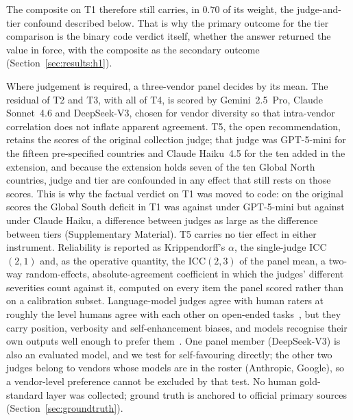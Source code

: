 The composite on T1 therefore still carries, in $0.70$ of its weight, the
judge-and-tier confound described below. That is why the primary outcome for the
tier comparison is the binary code verdict itself, whether the answer returned
the value in force, with the composite as the secondary outcome
(Section~\ref{sec:results:h1}).

Where judgement is required, a three-vendor panel decides by its mean. The
residual of T2 and T3, with all of T4, is scored by Gemini~2.5~Pro, Claude
Sonnet~4.6 and DeepSeek-V3, chosen for vendor diversity so that intra-vendor
correlation does not inflate apparent agreement. T5, the open recommendation,
retains the scores of the original collection judge; that judge was GPT-5-mini
for the fifteen pre-specified countries and Claude Haiku~4.5 for the ten added
in the extension, and because the extension holds seven of the ten Global North
countries, judge and tier are confounded in any effect that still rests on those
scores. This is why the factual verdict on T1 was moved to code: on the original
scores the Global South deficit in T1 was \njtgsgpt{} against \njtgngpt{} under
GPT-5-mini but \njtgshaiku{} against \njtgnhaiku{} under Claude Haiku, a
difference between judges as large as the difference between tiers
(Supplementary Material). T5 carries no tier effect in either instrument.
Reliability is reported as Krippendorff's $\alpha$, the single-judge ICC$(2,1)$
and, as the operative quantity, the ICC$(2,3)$ of the panel mean, a two-way
random-effects, absolute-agreement coefficient in which the judges' different
severities count against it, computed on every item the panel scored rather
than on a calibration subset. Language-model judges agree with human raters at
roughly the level humans agree with each other on open-ended
tasks~\citep{zheng2023judging}, but they carry position, verbosity and
self-enhancement biases, and models recognise their own outputs well enough to
prefer them~\citep{zheng2023judging,panickssery2024self}. One panel member
(DeepSeek-V3) is also an evaluated model, and we test for self-favouring
directly; the other two judges
belong to vendors whose models are in the roster (Anthropic, Google), so a
vendor-level preference cannot be excluded by that test. No human gold-standard
layer was collected; ground truth is anchored to official primary sources
(Section~\ref{sec:groundtruth}).

